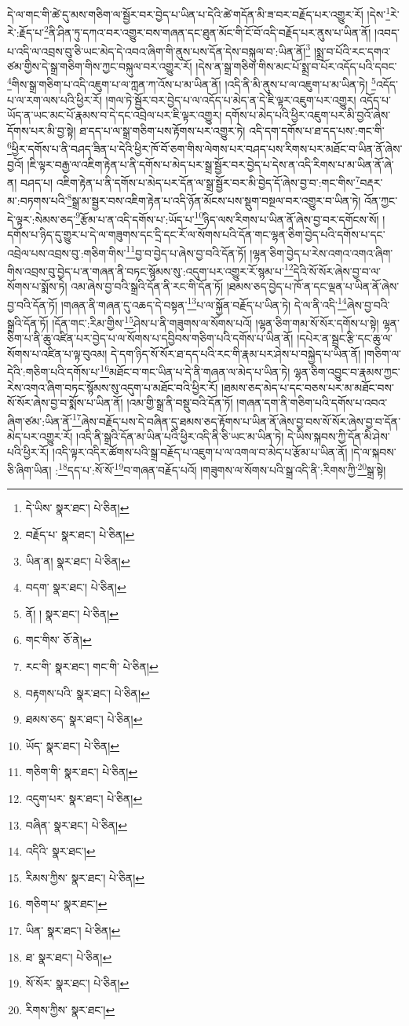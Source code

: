 དེ་ལ་གང་གི་ཚེ་དུ་མས་གཅིག་ལ་སྦྱོར་བར་བྱེད་པ་ཡིན་པ་དེའི་ཚེ་གདོན་མི་ཟ་བར་བརྗོད་པར་འགྱུར་རོ། །དེས་\footnote{དེ་ཡིས་  སྣར་ཐང་།  པེ་ཅིན། }རེ་རེ་:རྗོད་པ་\footnote{བརྗོད་པ་  སྣར་ཐང་།  པེ་ཅིན། }ནི་ཤིན་ཏུ་དཀའ་བར་འགྱུར་བས་གཞན་དང་ཐུན་མོང་གི་ངོ་བོ་འདི་བརྗོད་པར་ནུས་པ་ཡིན་ནོ། །འབད་པ་འདི་ལ་འབྲས་བུ་ཅི་ཡང་མེད་དེ་འབའ་ཞིག་གི་ནུས་པས་དོན་དེས་བསྐུལ་བ་:ཡིན་ནོ།\footnote{ཡིན་ན།  སྣར་ཐང་།  པེ་ཅིན། } །སྨྲ་བ་པོའི་རང་དགའ་ཙམ་གྱིས་དེ་སྒྲ་གཅིག་གིས་ཀྱང་བསྐུལ་བར་འགྱུར་རོ། །དེས་ན་སྒྲ་གཅིག་གིས་མང་པོ་སྨྲ་བ་པོར་འདོད་པའི་དབང་\footnote{བདག་  སྣར་ཐང་།  པེ་ཅིན། }གིས་སྒྲ་གཅིག་པ་འདི་འཇུག་པ་ལ་ཀླན་ཀ་འོས་པ་མ་ཡིན་ནོ། །འདི་ནི་མི་ནུས་པ་ལ་འཇུག་པ་མ་ཡིན་ཏེ། \footnote{ནོ། །   སྣར་ཐང་།  པེ་ཅིན། }འདོད་པ་ལ་རག་ལས་པའི་ཕྱིར་རོ། །གལ་ཏེ་སྦྱོར་བར་བྱེད་པ་ལ་འདོད་པ་མེད་ན་དེ་ཇི་ལྟར་འཇུག་པར་འགྱུར། འདོད་པ་ཡོད་ན་ཡང་མང་པོ་རྣམས་བ་དེ་དང་འབྲེལ་པར་ཇི་ལྟར་འགྱུར། དགོས་པ་མེད་པའི་ཕྱིར་འཇུག་པར་མི་བྱའོ་ཞེས་དོགས་པར་མི་བྱ་སྟེ། ཐ་དད་པ་ལ་སྒྲ་གཅིག་པས་རྟོགས་པར་འགྱུར་ཏེ། འདི་དག་དགོས་པ་ཐ་དད་པས་:གང་གི་\footnote{གང་གིས་  ཅོ་ནེ། }ཕྱིར་དགོས་པ་ནི་བཤད་ཟིན་པ་དེའི་ཕྱིར་ཁོ་བོ་ཅག་གིས་ལེགས་པར་བཤད་པས་རིགས་པར་མཐོང་བ་ཡིན་ནོ་ཞེས་བྱའོ། །ཇི་ལྟར་བརྒྱ་ལ་འཇིག་རྟེན་པ་ནི་དགོས་པ་མེད་པར་སྒྲ་སྦྱོར་བར་བྱེད་པ་དེས་ན་འདི་རིགས་པ་མ་ཡིན་ནོ་ཞེ་ན། བཤད་པ། འཇིག་རྟེན་པ་ནི་དགོས་པ་མེད་པར་དོན་ལ་སྒྲ་སྦྱོར་བར་མི་བྱེད་དོ་ཞེས་བྱ་བ་:གང་གིས་\footnote{རང་གི་  སྣར་ཐང་། གང་གི་  པེ་ཅིན། }བརྡར་མ་:བཏགས་པའི་\footnote{བརྟགས་པའི་  སྣར་ཐང་།  པེ་ཅིན། }སྒྲ་མ་སྦྱར་བས་འཇིག་རྟེན་པ་འདི་ཉོན་མོངས་པས་སྡུག་བསྔལ་བར་འགྱུར་བ་ཡིན་ཏེ། འོན་ཀྱང་དེ་ལྟར་:སེམས་ཅད་\footnote{ཐམས་ཅད་  སྣར་ཐང་།  པེ་ཅིན། }རྩོམ་པ་ན་འདི་དགོས་པ་:ཡོད་པ་\footnote{ཡོད་  སྣར་ཐང་།  པེ་ཅིན། }ཉིད་ལས་རིགས་པ་ཡིན་ནོ་ཞེས་བྱ་བར་དགོངས་སོ། །དགོས་པ་ཉིད་དུ་གྱུར་པ་དེ་ལ་གཟུགས་དང་དྲི་དང་རོ་ལ་སོགས་པའི་དོན་གང་ལྷན་ཅིག་བྱེད་པའི་དགོས་པ་དང་འབྲེལ་པས་འབྲས་བུ་:གཅིག་གིས་\footnote{གཅིག་གི་  སྣར་ཐང་།  པེ་ཅིན། }བྱ་བ་བྱེད་པ་ཞེས་བྱ་བའི་དོན་ཏོ། །ལྷན་ཅིག་བྱེད་པ་རེས་འགའ་འགའ་ཞིག་གིས་འབྲས་བུ་བྱེད་པ་ན་གཞན་ནི་བཏང་སྙོམས་སུ་:འདུག་པར་འགྱུར་རོ་སྙམ་པ་\footnote{འདུག་པར་  སྣར་ཐང་།  པེ་ཅིན། }དེའི་སོ་སོར་ཞེས་བྱ་བ་ལ་སོགས་པ་སྨོས་ཏེ། འམ་ཞེས་བྱ་བའི་སྒྲའི་དོན་ནི་རང་གི་དོན་ཏོ། །ཐམས་ཅད་བྱེད་པ་ཁོ་ན་དང་ལྡན་པ་ཡིན་ནོ་ཞེས་བྱ་བའི་དོན་ཏོ། །གཞན་ནི་གཞན་དུ་འཆད་དེ་བསྟན་\footnote{བཞིན་  སྣར་ཐང་།  པེ་ཅིན། }པ་ལ་སྐྱོན་བརྗོད་པ་ཡིན་ཏེ། དེ་ལ་ནི་འདི་\footnote{འདིའི་  སྣར་ཐང་། }ཞེས་བྱ་བའི་སྒྲའི་དོན་ཏོ། །དོན་གང་:རིམ་གྱིས་\footnote{རིམས་ཀྱིས་  སྣར་ཐང་།  པེ་ཅིན། }ཤེས་པ་ནི་གཟུགས་ལ་སོགས་པའོ། །ལྷན་ཅིག་གམ་སོ་སོར་དགོས་པ་སྟེ། ལྷན་ཅིག་པ་ནི་ཆུ་འཛིན་པར་བྱེད་པ་ལ་སོགས་པ་དབྱིབས་གཅིག་པའི་དགོས་པ་ཡིན་ནོ། །དཔེར་ན་སྦྲང་རྩི་དང་ཆུ་ལ་སོགས་པ་འཛིན་པ་ལྟ་བུའམ། དེ་དག་ཉིད་སོ་སོར་ཐ་དད་པའི་རང་གི་རྣམ་པར་ཤེས་པ་བསྐྱེད་པ་ཡིན་ནོ། །གཅིག་ལ་དེའི་:གཅིག་པའི་དགོས་པ་\footnote{གཅིག་པ་  སྣར་ཐང་། }མཐོང་བ་གང་ཡིན་པ་དེ་ནི་གཞན་ལ་མེད་པ་ཡིན་ཏེ། ལྷན་ཅིག་འབྱུང་བ་རྣམས་ཀྱང་རེས་འགའ་ཞིག་བཏང་སྙོམས་སུ་འདུག་པ་མཐོང་བའི་ཕྱིར་རོ། །ཐམས་ཅད་མེད་པ་དང་བཅས་པར་མ་མཐོང་བས་སོ་སོར་ཞེས་བྱ་བ་སྨོས་པ་ཡིན་ནོ། །འམ་གྱི་སྒྲ་ནི་བསྡུ་བའི་དོན་ཏོ། །གཞན་དག་ནི་གཅིག་པའི་དགོས་པ་འབའ་ཞིག་ཙམ་:ཡིན་ནོ་\footnote{ཡིན་  སྣར་ཐང་།  པེ་ཅིན། }ཞེས་བརྗོད་པས་དེ་བཞིན་དུ་ཐམས་ཅད་རྟོགས་པ་ཡིན་ནོ་ཞེས་བྱ་བས་སོ་སོར་ཞེས་བྱ་བ་དོན་མེད་པར་འགྱུར་རོ། །འདི་ནི་སྒྲའི་དོན་མ་ཡིན་པའི་ཕྱིར་འདི་ནི་ཅི་ཡང་མ་ཡིན་ཏེ། དེ་ཡིས་སྐབས་ཀྱི་དོན་མི་ཤེས་པའི་ཕྱིར་རོ། །འདི་ལྟར་འདིར་ཚོགས་པའི་སྒྲ་བརྗོད་པ་འཇུག་པ་ལ་འགལ་བ་མེད་པ་རྩོམ་པ་ཡིན་ནོ། །དེ་ལ་སྐབས་ཅི་ཞིག་ཡིན། :\footnote{ཐ་  སྣར་ཐང་།  པེ་ཅིན། }དད་པ་:སོ་སོ་\footnote{སོ་སོར་  སྣར་ཐང་།  པེ་ཅིན། }བ་གཞན་བརྗོད་པའོ། །གཟུགས་ལ་སོགས་པའི་སྒྲ་འདི་ནི་:རིགས་ཀྱི་\footnote{རིགས་ཀྱིས་  སྣར་ཐང་། }སྒྲ་སྟེ། 